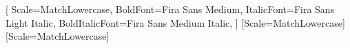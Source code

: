 \usepackage{fontspec}

\usepackage{amsmath}
\usepackage{amssymb}
\usepackage{mathtools}
\usepackage{unicode-math}

\renewcommand{\frac}[2]{\genfrac{}{}{0.5pt}{0}{#1}{#2}}

\setsansfont{Fira Sans Light}[
	Scale=MatchLowercase,
	BoldFont=Fira Sans Medium,
	ItalicFont=Fira Sans Light Italic,
	BoldItalicFont=Fira Sans Medium Italic,
]
\setmonofont{Fira Mono}[Scale=MatchLowercase]
[Scale=MatchLowercase]

\usepackage{bm}

\usepackage{xcolor}

\usepackage{microtype}
